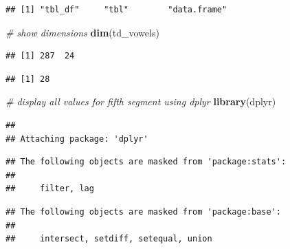 \documentclass[]{book}
\newenvironment{Shaded}{\begin{snugshade}}{\end{snugshade}}
\newcommand{\CommentTok}[1]{\textcolor[rgb]{0.56,0.35,0.01}{\textit{#1}}}
\newcommand{\DecValTok}[1]{\textcolor[rgb]{0.00,0.00,0.81}{#1}}
\newcommand{\KeywordTok}[1]{\textcolor[rgb]{0.13,0.29,0.53}{\textbf{#1}}}
\newcommand{\NormalTok}[1]{#1}
\newcommand{\OperatorTok}[1]{\textcolor[rgb]{0.81,0.36,0.00}{\textbf{#1}}}
\newcommand{\StringTok}[1]{\textcolor[rgb]{0.31,0.60,0.02}{#1}}
\theoremstyle{definition}
\theoremstyle{definition}
\theoremstyle{definition}
\theoremstyle{remark}
\begin{document}
\begin{verbatim}
## [1] "tbl_df"     "tbl"        "data.frame"
\end{verbatim}

\begin{Shaded}
\begin{Highlighting}[]
\CommentTok{# show dimensions}
\KeywordTok{dim}\NormalTok{(td_vowels)}
\end{Highlighting}
\end{Shaded}

\begin{verbatim}
## [1] 287  24
\end{verbatim}

\begin{Shaded}
\end{Shaded}

\begin{verbatim}
## [1] 28
\end{verbatim}

\begin{Shaded}
\begin{Highlighting}[]
\CommentTok{# display all values for fifth segment using dplyr}
\KeywordTok{library}\NormalTok{(dplyr)}
\end{Highlighting}
\end{Shaded}

\begin{verbatim}
## 
## Attaching package: 'dplyr'
\end{verbatim}

\begin{verbatim}
## The following objects are masked from 'package:stats':
## 
##     filter, lag
\end{verbatim}

\begin{verbatim}
## The following objects are masked from 'package:base':
## 
##     intersect, setdiff, setequal, union
\end{verbatim}

\begin{Shaded}
\end{Shaded}
\end{document}
